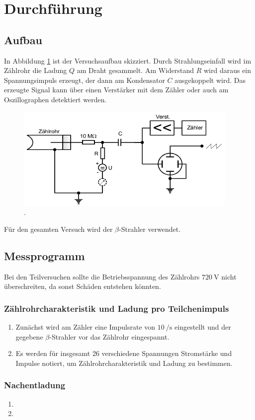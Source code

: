 \section{Durchführung}
\label{sec:Durchführung}

\subsection{Aufbau}

In Abbildung \ref{fig:VA} ist der Versuchsaufbau skizziert.
Durch Strahlungseinfall wird im Zählrohr die Ladung $Q$ am Draht gesammelt.
Am Widerstand $R$ wird daraus ein Spannungsimpuls erzeugt, der dann am
Kondensator $C$ ausgekoppelt wird. Das erzeugte Signal kann über einen
Verstärker mit dem Zähler oder auch am Oszillographen detektiert werden.

\begin{figure}
  \centering
  \includegraphics[height=5cm]{MeinePics;)/VA.png}
  \caption{.\cite{anleitung}}
  \label{fig:VA}
\end{figure}

Für den gesamten Versuch wird der $\beta$-Strahler  verwendet.

\subsection{Messprogramm}

Bei den Teilversuchen sollte die Betriebsspannung des Zählrohrs
$\SI{720}{\volt}$ nicht überschreiten, da sonst Schäden entstehen könnten.

\subsubsection{Zählrohrcharakteristik und Ladung pro Teilchenimpuls}
\begin{enumerate}
  \item Zunächst wird am Zähler eine Impulsrate von $\SI{10}{\per\second}$ eingestellt
  und der gegebene $\beta$-Strahler vor das Zählrohr eingespannt.
  \item Es werden für insgesamt 26 verschiedene Spannungen Stromstärke und
  Impulse notiert, um Zählrohrcharakteristik und Ladung zu bestimmen.
\end{enumerate}

\subsubsection{Nachentladung}
\begin{enumerate}
  \item
  \item
\end{enumerate}
